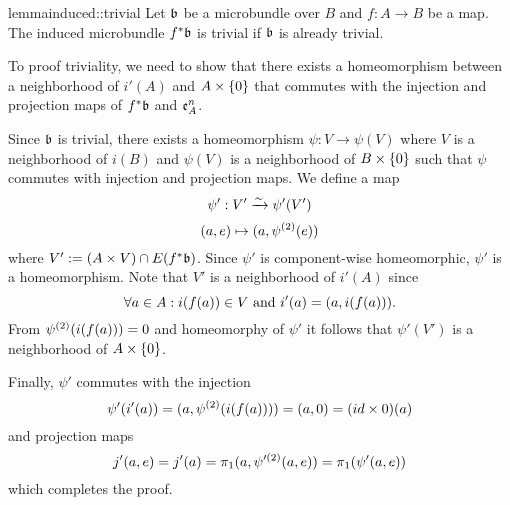 \begin{mystatement}{lemma}{induced::trivial}
    Let $\bb$ be a microbundle over $B$ and $f: A \to B$ be a map.
    The induced microbundle $\ind{f}\bb$ is trivial if $\bb$ is already trivial.
\end{mystatement}

\begin{myproof}
    To proof triviality, we need to show that there exists a homeomorphism between a neighborhood of $i'(A)$ and $A \times{} \{0\}$
    that commutes with the injection and projection maps of $\ind{f}\bb$ and $\mathfrak{e}^{n}_{A}$.
    
    Since $\bb$ is trivial, there exists a homeomorphism $\psi: V \to \psi(V)$
    where $V$ is a neighborhood of $i(B)$ and $\psi(V)$ is a neighborhood of $B \times \{0\}$
    such that $\psi$ commutes with injection and projection maps.
    We define a map 
    \[ \psi': V' \xrightarrow{\sim} \psi'(V') \]
    \[ (a, e) \mapsto (a, \psi^{(2)}(e)) \]
    where $V' := (A \cross V) \cap E(\ind{f}\bb)$.
    Since $\psi'$ is component-wise homeomorphic, $\psi'$ is a homeomorphism.
    Note that $V'$ is a neighborhood of $i'(A)$ since
    \[ \forall a \in A: i(f(a)) \in V \text{ and } i'(a) = (a, i(f(a))). \]
    From $\psi^{(2)}(i(f(a))) = 0$ and homeomorphy of $\psi'$ it follows that $\psi'(V')$ is a neighborhood of $A \times{} \{0\}$.

    Finally, $\psi'$ commutes with the injection
    \[ \psi'(i'(a)) = (a, \psi^{(2)}(i(f(a)))) = (a, 0) = (id \times 0)(a) \]
    and projection maps
    \[ j'(a, e) = j'(a) = \pi_1(a, \psi'^{(2)}(a, e)) = \pi_1(\psi'(a, e)) \]
    which completes the proof.
\end{myproof}